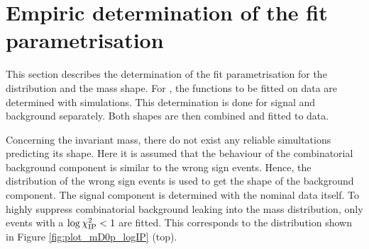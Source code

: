 \section{Empiric determination of  the fit parametrisation}
This section describes the determination of the fit parametrisation for the \logIP distribution and the \Dz\proton mass shape.
For \logIP, the functions to be fitted on data are determined with simulations.
This determination is done for signal and background separately.
Both shapes are then combined and fitted to data.

Concerning the invariant \Dz\proton mass, there do not exist any reliable simultations predicting its shape.
Here it is assumed that the behaviour of the combinatorial background component is similar to the wrong sign events.
Hence, the \MDp distribution of the wrong sign events is used to get the shape of the background component.
The signal component is determined with the nominal data itself.
To highly suppress combinatorial background leaking into the \Dz\proton mass distribution, only events with a $\log \chi^2_{\text{IP}} < 1$ are fitted.
This corresponds to the distribution shown in Figure \ref{fig:plot_mD0p_logIP} (top).

